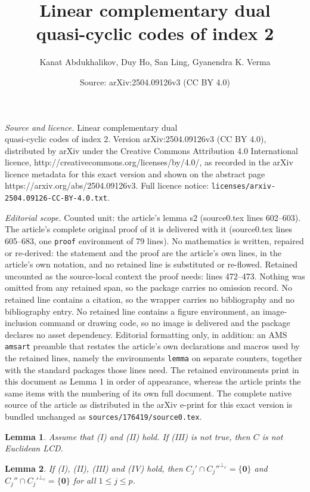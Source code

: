 \documentclass[10pt,a4paper]{amsart}
\title{Linear complementary dual \\quasi-cyclic codes of index 2}
\author{Kanat Abdukhalikov, Duy Ho, San Ling, Gyanendra K. Verma}
\date{Source: arXiv:2504.09126v3 (CC BY 4.0)}
\newtheorem{lemma}{Lemma}
\begin{document}
\maketitle

\noindent\emph{Source and licence.} Linear complementary dual \\quasi-cyclic codes of index 2. Version arXiv:2504.09126v3 (CC BY 4.0), distributed by arXiv under the Creative Commons Attribution 4.0 International licence, http://creativecommons.org/licenses/by/4.0/, as recorded in the arXiv licence metadata for this exact version and shown on the abstract page https://arxiv.org/abs/2504.09126v3. Full licence notice: \texttt{licenses/arxiv-2504.09126-CC-BY-4.0.txt}.\par\smallskip

\noindent\textit{Editorial scope.} Counted unit: the article's lemma s2 (source0.tex lines 602--603). The article's complete original proof of it is delivered with it (source0.tex lines 605--683, one \texttt{proof} environment of 79 lines). No mathematics is written, repaired or re-derived: the statement and the proof are the article's own lines, in the article's own notation, and no retained line is substituted or re-flowed.  Retained uncounted as the source-local context the proof needs: lines 472--473.  Nothing was omitted from any retained span, so the package carries no omission record.  No retained line contains a citation, so the wrapper carries no bibliography and no bibliography entry.  No retained line contains a figure environment, an image-inclusion command or drawing code, so no image is delivered and the package declares no asset dependency.  Editorial formatting only, in addition: an AMS \texttt{amsart} preamble that restates the article's own declarations and macros used by the retained lines, namely the environments \texttt{lemma} on separate counters, together with the standard packages those lines need.  The retained environments print in this document as Lemma 1 in order of appearance, whereas the article prints the same items with the numbering of its own full document.  The complete native source of the article as distributed in the arXiv e-print for this exact version is bundled unchanged as \texttt{sources/176419/source0.tex}.
\begin{lemma} \label{nIII} Assume that (I) and (II) hold. If (III) is not true, then $C$ is not Euclidean LCD. 
\end{lemma}

\begin{lemma} \label{s2}  If (I), (II), (III) and (IV) hold, then $C_j' \cap C_j''^{\perp_e} = \{\mathbf{0}\}$ and $C_j'' \cap C_j'^{\perp_e} = \{\mathbf{0}\}$  for all $1\le j \le p$.  
\end{lemma}
\end{document}
